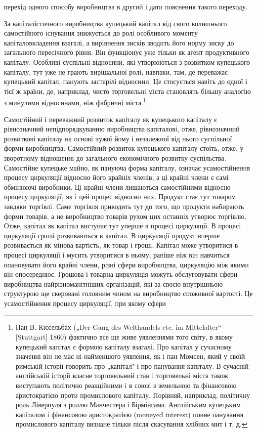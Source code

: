 перехід одного способу виробництва в другий і дати пояснення
такого переходу.

За капіталістичного виробництва купецький капітал від свого
колишнього самостійного існування знижується до ролі особливого
моменту капіталовкладення взагалі, а вирівнення зисків
зводить його норму зиску до загального пересічного рівня. Він
функціонує уже тільки як агент продуктивного капіталу. Особливі
суспільні відносини, які утворюються з розвитком купецького
капіталу, тут уже не грають вирішальної ролі; навпаки, там,
де переважає купецький капітал, панують застарілі відносини.
Це стосується навіть до одної і тієї ж країни, де, наприклад,
чисто торговельні міста становлять більшу аналогію з минулими
відносинами, ніж фабричні міста.\footnote{
Пан В. Кіссельбах („Der Gang des Welthandels etc. im Mittelalter“ [Stuttgart]
1860) фактично все ще живе уявленнями того світу, в якому купецький
капітал є формою капіталу взагалі. Про капітал у сучасному значенні він не
має ні найменшого уявлення, як і пан Момсен, який у своїй римській історії
говорить про „капітал" і про панування капіталу. В сучасній англійській історії
власне торговельний стан і торговельні міста також виступають політично
реакційними і в союзі з земельною та фінансовою аристократією проти промислового
капіталу. Порівняй, наприклад, політичну роль Ліверпуля з роллю Манчестера
і Бірмінгама. Англійським купецьким капіталом і фінансовою аристократією
(moneyed interest) повне панування промислового капіталу визнане
тільки після скасування хлібних мит і т. д.
}

Самостійний і переважний розвиток капіталу як купецького
капіталу є рівнозначний непідпорядкуванню виробництва капіталові,
отже, рівнозначний розвиткові капіталу на основі чужої
йому і незалежної від нього суспільної форми виробництва. Самостійний
розвиток купецького капіталу стоїть, отже, у зворотному
відношенні до загального економічного розвитку суспільства.
Самостійне купецьке майно, як пануюча форма капіталу,
означає усамостійнення процесу циркуляції відносно його крайніх
членів, а ці крайні члени є самі обмінюючі виробники. Ці крайні
члени лишаються самостійними відносно процесу циркуляції, як
і цей процес відносно них. Продукт стає тут товаром завдяки
торгівлі. Саме торгівля приводить тут до того, що продукти
набирають форми товарів, а не виробництво товарів рухом цих
останніх утворює торгівлю. Отже, капітал як капітал виступає тут
уперше в процесі циркуляції. В процесі циркуляції гроші розвиваються
в капітал. В циркуляції продукт вперше розвивається
як мінова вартість, як товар і гроші. Капітал може утворитися
в процесі циркуляції і мусить утворитися в ньому, раніше ніж
він навчиться опановувати його крайні члени, різні сфери виробництва,
циркуляцію між якими він опосереднює. Грошова і товарна
циркуляція можуть обслуговувати сфери виробництва найрізноманітніших
організацій, які за своєю внутрішньою структурою
ще скеровані головним чином на виробництво споживної
вартості. Це усамостійнення процесу циркуляції, при якому сфери